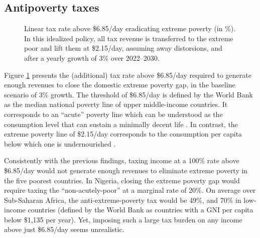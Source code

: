 \subsection{Antipoverty taxes}

\begin{figure}[b!]
  \caption[Anti-extreme-poverty tax above \$6.85/day in 2030 after 3\% growth.]{Linear tax rate above \$6.85/day eradicating extreme poverty (in \%). In this idealized policy, all tax revenue is transferred to the extreme poor and lift them at \$2.15/day, assuming away distorsions, and after a yearly growth of 3\% over 2022--2030. 
  }\label{fig:antipoverty_tax_7}
\end{figure}

Figure \ref{fig:antipoverty_tax_7} presents the (additional) tax rate above \$6.85/day required to generate enough revenues to close the domestic extreme poverty gap, in the baseline scenario of 
3\% growth. The threshold of \$6.85/day is defined by the World Bank as the median national poverty line of upper middle-income countries. It corresponds to an ``acute'' poverty line which can be understood as the consumption level that can sustain a minimally decent life \citep{hickel_is_2019,kikstra_decent_2021}. In contrast, the extreme poverty line of \$2.15/day corresponds to the consumption per capita below which one is undernourished \citep{allen_absolute_2017}. 

Consistently with the previous findings, taxing income at a 100\% rate above \$6.85/day would not generate enough revenues to eliminate extreme poverty in the five poorest countries. In Nigeria, closing the extreme poverty gap would require taxing the ``non-acutely-poor'' at a marginal rate of 20\%. 
On average over Sub-Saharan Africa, the anti-extreme-poverty tax would be 49\%, and 70\% in low-income countries (defined by the World Bank as countries with a GNI per capita below \$1,135 per year). Yet, imposing such a large tax burden on any income above just \$6.85/day seems unrealistic. 

